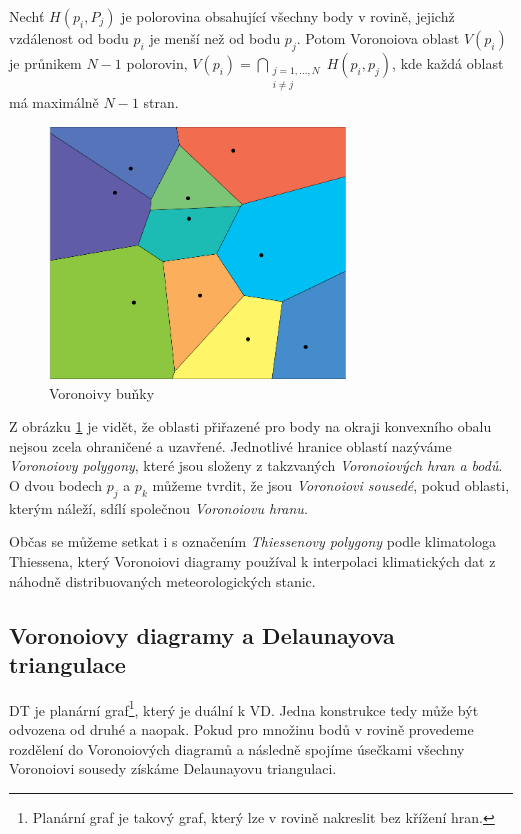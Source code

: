 \documentclass[12pt,a4paper]{article}
\begin{document}
{Nechť $H(p_i,P_j)$ je polorovina obsahující všechny body v rovině,
jejichž vzdálenost od bodu $p_i$ je menší než od bodu $p_j$. Potom
Voronoiova oblast $V(p_i)$ je průnikem $N-1$ polorovin,
$V(p_i)= \bigcap\limits_{\substack{j=1,...,N \\ i\not=j}}H(p_i,p_j)$,
kde každá oblast má maximálně $N-1$ stran.

\newpage
\begin{figure}[h!]
\centering
\includegraphics[width=0.7\textwidth]{img/vor_pol.png}
\caption{Voronoivy buňky}
\label{fig:vor_pol}
\end{figure}

Z obrázku \ref{fig:vor_pol} je vidět, že oblasti přiřazené pro body na
okraji konvexního obalu nejsou zcela ohraničené a uzavřené. Jednotlivé
hranice oblastí nazýváme \emph{Voronoiovy polygony}, které jsou
složeny z takzvaných \emph{Voronoiových hran a bodů}. O dvou bodech
$p_j$ a $p_k$ můžeme tvrdit, že jsou \emph{Voronoiovi sousedé}, pokud
oblasti, kterým náleží, sdílí společnou \emph{Voronoiovu hranu}.

Občas se můžeme setkat i s označením \emph{Thiessenovy polygony} podle
klimatologa Thiessena, který Voronoiovi diagramy používal k
interpolaci klimatických dat z náhodně distribuovaných
meteorologických stanic.

\newpage
\subsection{Voronoiovy diagramy a Delaunayova triangulace}
\label{sub:VDaDT}

DT je planární graf\footnote{Planární graf je takový graf, který lze v rovině nakreslit bez křížení hran.}, který je duální k VD. Jedna konstrukce tedy může
být odvozena od druhé a naopak.  Pokud pro množinu bodů v rovině
provedeme rozdělení do Voronoiových diagramů a následně spojíme
úsečkami všechny Voronoiovi sousedy získáme Delaunayovu triangulaci.

}
\end{document}
